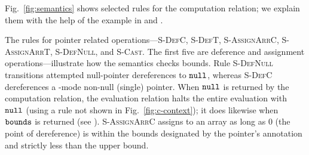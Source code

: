 


Fig.~\ref{fig:semantics} shows selected rules for the computation
relation; we explain them with the help of the example in  and .



%
The rules for pointer related operations---\textsc{S-DefC},
\textsc{S-DefT}, \textsc{S-AssignArrC}, \textsc{S-AssignArrT},
\textsc{S-DefNull}, and \textsc{S-Cast}.
The first five are deference and assignment operations---illustrate how the semantics checks bounds.
Rule \textsc{S-DefNull} transitions attempted null-pointer
dereferences to $\mathtt{null}$, whereas \textsc{S-DefC} dereferences a \cmode-mode
non-null (single) pointer.
When $\mathtt{null}$ is returned by the
computation relation, the evaluation relation halts the entire
evaluation with $\mathtt{null}$ (using a rule not shown in Fig.~\ref{fig:c-context}); it
does likewise when $\mathtt{bounds}$ is returned (see ).
\textsc{S-AssignArrC} assigns to an array as long as 0 (the point of
dereference) is within the bounds designated by the pointer's annotation
and strictly less than the upper bound. 

